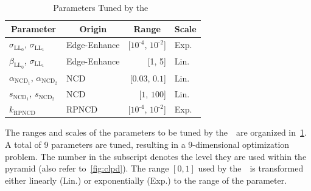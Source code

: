 \begin{table}
  \centering
  \caption{Parameters Tuned by the~\usdg}\label{table:params}
  \begin{threeparttable}
  \begin{tabular}{llrl}
    \toprule
    \multicolumn{1}{c}{\textbf{Parameter}}
    & \multicolumn{1}{c}{\textbf{Origin}}
    & \multicolumn{1}{c}{\textbf{Range}}
    & \multicolumn{1}{c}{\textbf{Scale}}
    \\ \midrule
    \(\sigma_{\mathrm{LL}_0}\), \(\sigma_{\mathrm{LL}_1}\)  & Edge-Enhance & [\(10^{\text{-}4}\), \(10^{\text{-}2}\)] & Exp.  \\
    \(\beta_{\mathrm{LL}_0}\), \(\sigma_{\mathrm{LL}_1}\)   & Edge-Enhance & [1, 5]                   & Lin. \\
    \(\alpha_{\mathrm{NCD}_1}\), \(\alpha_{\mathrm{NCD}_2}\) & NCD          & [\(0.03\), \(0.1\)]     & Lin.  \\
    \(s_{\mathrm{NCD}_1}\), \(s_{\mathrm{NCD}_2}\)           & NCD          & [\(1\), \(100\)]        & Lin. \\
    \(k_{\text{RPNCD}}\)                                & RPNCD        & [\(10^{\text{-}4}\), \(10^{\text{-}2}\)] & Exp. \\\bottomrule
  \end{tabular}
  \end{threeparttable}
\end{table}
%
The ranges and scales of the parameters to be tuned by the~\usdg~are organized in~\cref{table:params}.
A total of 9 parameters are tuned, resulting in a 9-dimensional optimization problem.
The number in the subscript denotes the level they are used within the pyramid (also refer to~\cref{fig:clpd}).
The range \([0, 1]\) used by the~\usdg~is transformed either linearly (Lin.) or exponentially (Exp.) to the range of the parameter.


